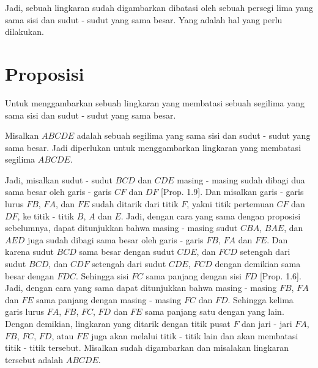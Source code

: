 \documentclass[a4paper]{book}
\begin{document}
Jadi, sebuah lingkaran sudah digambarkan dibatasi oleh sebuah persegi lima yang sama sisi dan sudut - sudut yang sama besar. Yang adalah hal yang perlu 
dilakukan.  

\section*{\centering Proposisi \thesection}
Untuk menggambarkan sebuah lingkaran yang membatasi sebuah segilima yang 
sama sisi dan sudut - sudut yang sama besar.

\begin{center} 
\end{center}

Misalkan $ABCDE$ adalah sebuah segilima yang sama sisi dan sudut - sudut yang
sama besar. Jadi diperlukan untuk menggambarkan lingkaran yang membatasi 
segilima $ABCDE$.

Jadi, misalkan sudut - sudut $BCD$ dan $CDE$ masing - masing sudah dibagi dua 
sama besar oleh garis - garis $CF$ dan $DF$ [Prop. 1.9]. Dan misalkan garis - 
garis lurus $FB$, $FA$, dan $FE$ sudah ditarik dari titik $F$, yakni titik
pertemuan $CF$ dan $DF$, ke titik - titik $B$, $A$ dan $E$. Jadi, dengan cara
yang sama dengan proposisi sebelumnya, dapat ditunjukkan bahwa masing - masing
 sudut $CBA$, $BAE$, dan $AED$ juga sudah dibagi sama besar oleh garis - garis
 $FB$, $FA$ dan $FE$. Dan karena sudut $BCD$ sama besar dengan sudut $CDE$, dan
$FCD$ setengah dari sudut $BCD$, dan $CDF$ setengah dari sudut $CDE$, $FCD$ 
dengan demikian sama besar dengan $FDC$. Sehingga sisi $FC$ sama panjang 
dengan sisi $FD$ [Prop. 1.6]. Jadi, dengan cara yang sama dapat ditunjukkan
bahwa masing - masing $FB$, $FA$ dan $FE$ sama panjang dengan masing - masing
$FC$ dan $FD$. Sehingga kelima garis lurus $FA$, $FB$, $FC$, $FD$ dan $FE$ sama
panjang satu dengan yang lain. Dengan demikian, lingkaran yang ditarik dengan
titik pusat $F$ dan jari - jari $FA$, $FB$, $FC$, $FD$, atau $FE$ juga akan 
melalui titik - titik lain dan akan membatasi titik - titik tersebut. Misalkan
sudah digambarkan dan misalakan lingkaran tersebut adalah $ABCDE$.
\end{document}
